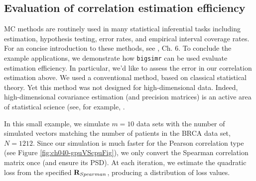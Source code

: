 \documentclass[]{article}
\begin{document}
\hypertarget{evaluation-of-correlation-estimation-efficiency}{%
\subsection{Evaluation of correlation estimation efficiency}\label{evaluation-of-correlation-estimation-efficiency}}

MC methods are routinely used in many statistical inferential tasks including estimation, hypothesis testing, error rates, and empirical interval coverage rates.
For an concise introduction to these methods, see \citet{Rizzo2007}, Ch. 6.
To conclude the example applications, we demonstrate how \texttt{bigsimr} can be used evaluate estimation efficiency.
In particular, we'd like to assess the error in our correlation estimation above.
We used a conventional method, based on classical statistical theory.
Yet this method was not designed for high-dimensional data.
Indeed, high-dimensional covariance estimation (and precision matrices) is an active area of statistical science (see, for example, \citep{Won2013g, VanWieringen2016}.

In this small example, we simulate \(m=10\) data sets with the number of simulated vectors matching the number of patients in the BRCA data set, \(N=1212\).
Since our simulation is much faster for the Pearson correlation type (see Figure \ref{fig:ch040-gpuVScpuFig}), we only convert the Spearman correlation matrix once (and ensure its PSD).
At each iteration, we estimate the quadratic loss from the specified \({\bf R}_{Spearman}\), producing a distribution of loss values.
\end{document}
